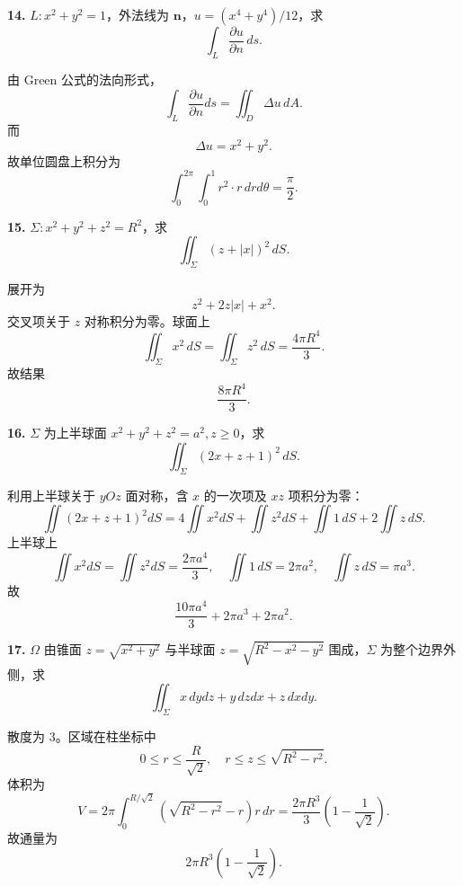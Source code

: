 \begin{problemblock}
\textbf{14.} \(L:x^2+y^2=1\)，外法线为 \(\boldsymbol n\)，\(u=(x^4+y^4)/12\)，求
\[
\int_L\frac{\partial u}{\partial n}\,ds.
\]
\end{problemblock}
\begin{solutionblock}
由 Green 公式的法向形式，
\[
\int_L\frac{\partial u}{\partial n}ds
=\iint_D\Delta u\,dA.
\]
而
\[
\Delta u=x^2+y^2.
\]
故单位圆盘上积分为
\[
\int_0^{2\pi}\int_0^1r^2\cdot r\,drd\theta
=\boxed{\frac{\pi}{2}}.
\]
\end{solutionblock}

\begin{problemblock}
\textbf{15.} \(\Sigma:x^2+y^2+z^2=R^2\)，求
\[
\iint_\Sigma (z+|x|)^2\,dS.
\]
\end{problemblock}
\begin{solutionblock}
展开为
\[
z^2+2z|x|+x^2.
\]
交叉项关于 \(z\) 对称积分为零。球面上
\[
\iint_\Sigma x^2\,dS=\iint_\Sigma z^2\,dS=\frac{4\pi R^4}{3}.
\]
故结果
\[
\boxed{\frac{8\pi R^4}{3}}.
\]
\end{solutionblock}

\begin{problemblock}
\textbf{16.} \(\Sigma\) 为上半球面 \(x^2+y^2+z^2=a^2,z\ge0\)，求
\[
\iint_\Sigma(2x+z+1)^2\,dS.
\]
\end{problemblock}
\begin{solutionblock}
利用上半球关于 \(yOz\) 面对称，含 \(x\) 的一次项及 \(xz\) 项积分为零：
\[
\iint(2x+z+1)^2dS
=4\iint x^2dS+\iint z^2dS+\iint1\,dS+2\iint z\,dS.
\]
上半球上
\[
\iint x^2dS=\iint z^2dS=\frac{2\pi a^4}{3},\quad
\iint1\,dS=2\pi a^2,\quad
\iint z\,dS=\pi a^3.
\]
故
\[
\boxed{\frac{10\pi a^4}{3}+2\pi a^3+2\pi a^2}.
\]
\end{solutionblock}

\begin{problemblock}
\textbf{17.} \(\Omega\) 由锥面 \(z=\sqrt{x^2+y^2}\) 与半球面 \(z=\sqrt{R^2-x^2-y^2}\) 围成，\(\Sigma\) 为整个边界外侧，求
\[
\iint_\Sigma x\,dydz+y\,dzdx+z\,dxdy.
\]
\end{problemblock}
\begin{solutionblock}
散度为 \(3\)。区域在柱坐标中
\[
0\le r\le\frac{R}{\sqrt2},\quad r\le z\le\sqrt{R^2-r^2}.
\]
体积为
\[
V=2\pi\int_0^{R/\sqrt2}\left(\sqrt{R^2-r^2}-r\right)r\,dr
=\frac{2\pi R^3}{3}\left(1-\frac1{\sqrt2}\right).
\]
故通量为
\[
\boxed{2\pi R^3\left(1-\frac1{\sqrt2}\right)}.
\]
\end{solutionblock}

